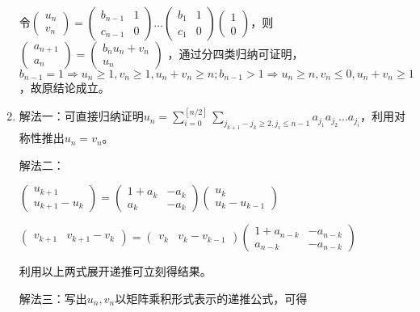 \documentclass[a4paper,UTF8,fontset=windows]{ctexart}
\begin{document}
\begin{enumerate}
令$\begin{pmatrix}u_n\\v_n\end{pmatrix}=\begin{pmatrix}b_{n-1}&1\\c_{n-1}&0\end{pmatrix}\dots\begin{pmatrix}b_1&1\\c_1&0\end{pmatrix}\begin{pmatrix}1\\0\end{pmatrix}$，则$\begin{pmatrix}a_{n+1}\\a_n\end{pmatrix}=\begin{pmatrix}b_nu_n+v_n\\u_n\end{pmatrix}$
，通过分四类归纳可证明，$b_{n-1}=1\Rightarrow u_n\ge1,v_n\ge1,u_n+v_n\ge n;b_{n-1}>1\Rightarrow u_n\ge n,v_n\le0,u_n+v_n\ge1$，故原结论成立。

\item
解法一：可直接归纳证明$u_n=\sum_{i=0}^{[n/2]}\sum_{j_{k+1}-j_k\ge2,j_i\le n-1} a_{j_1}a_{j_2}\dots a_{j_i}$，利用对称性推出$u_n=v_n$。

解法二： 

$\begin{pmatrix}u_{k+1}\\u_{k+1}-u_k\end{pmatrix}=\begin{pmatrix}1+a_k&-a_k\\a_k&-a_k\end{pmatrix}\begin{pmatrix}u_k\\u_k-u_{k-1}\end{pmatrix}$

$\begin{pmatrix}v_{k+1}&v_{k+1}-v_k\end{pmatrix}=\begin{pmatrix}v_k&v_k-v_{k-1}\end{pmatrix}\begin{pmatrix}1+a_{n-k}&-a_{n-k}\\a_{n-k}&-a_{n-k}\end{pmatrix}$

利用以上两式展开递推可立刻得结果。

解法三：写出$u_n,v_n$以矩阵乘积形式表示的递推公式，可得


\end{enumerate}
\end{document}
